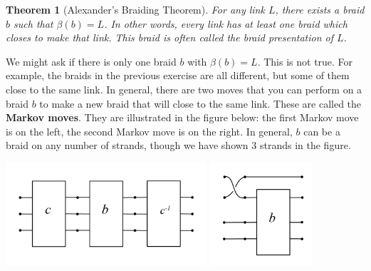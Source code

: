 \documentclass[12 pt]{article}
\newtheorem{theorem}{Theorem}
\newcounter{exercise}[section]
\begin{document}
\begin{theorem}[Alexander's Braiding Theorem]
	 For any link $L$, there exists a braid $b$ such that $\beta(b)=L$. In other words, every link has at least one braid which closes to make that link. This braid is often called the braid presentation of $L$.
\end{theorem}

We might ask if there is only one braid $b$ with $\beta(b)=L$. This is not true. For example, the braids in the previous exercise are all different, but some of them close to the same link. In general, there are two moves that you can perform on a braid $b$ to make a new braid that will close to the same link. These are called the \textbf{Markov moves}. They are illustrated in the figure below: the first Markov move is on the left, the second Markov move is on the right. In general, $b$ can be a braid on any number of strands, though we have shown 3 strands in the figure. 
\begin{center}
\includegraphics*[height = 1.5in]{markov_moves_1} \hspace{2cm} \includegraphics*[height = 1.5in]{markov_moves_2}  
\end{center}
\end{document}

